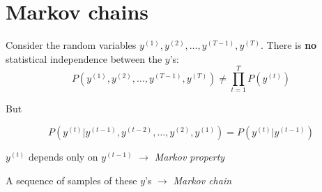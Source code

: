 \section{Markov chains}

\begin{frame} 
\end{frame}

\begin{frame}{\secname}

Consider the random variables $y^{(1)}, y^{(2)}, \ldots, y^{(T-1)}, y^{(T)}$.
There is \textbf{no} statistical independence between the $y$'s:
\begin{equation}
P(y^{(1)}, y^{(2)}, \ldots, y^{(T-1)}, y^{(T)}) \ne \prod_{t=1}^T P(y^{(t)})
\end{equation}

But

\begin{equation}
P(y^{(t)} | y^{(t-1)}, y^{(t-2)}, \ldots, y^{(2)}, y^{(1)}) = P(y^{(t)} | y^{(t-1)})
\end{equation}

$y^{(t)}$ depends only on $y^{(t-1)}$ $\rightarrow$ \emph{Markov property}

A sequence of samples of these $y$'s $\rightarrow$ \emph{Markov chain}

\end{frame}
